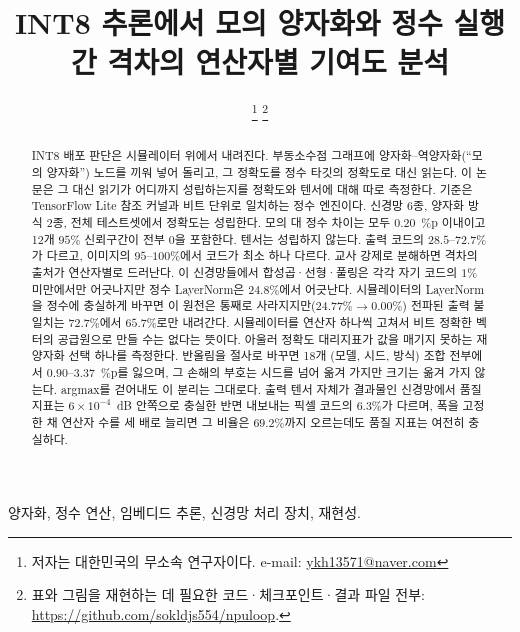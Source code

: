 \documentclass[journal]{IEEEtran}
\begin{document}
\title{INT8 추론에서 모의 양자화와 정수 실행 간 격차의 연산자별 기여도 분석}

\author{%
\thanks{저자는 대한민국의 무소속 연구자이다. e-mail: \url{ykh13571@naver.com}}%
\thanks{표와 그림을 재현하는 데 필요한 코드·체크포인트·결과 파일 전부:
\url{https://github.com/sokldjs554/npuloop}.}}

\maketitle

\begin{abstract}
INT8 배포 판단은 시뮬레이터 위에서 내려진다. 부동소수점 그래프에 양자화--역양자화(``모의 양자화'') 노드를
끼워 넣어 돌리고, 그 정확도를 정수 타깃의 정확도로 대신 읽는다. 이 논문은 그 대신 읽기가 어디까지
성립하는지를 정확도와 텐서에 대해 따로 측정한다. 기준은 TensorFlow Lite 참조 커널과 비트 단위로 일치하는
정수 엔진이다. 신경망 6종, 양자화 방식 2종, 전체 테스트셋에서 정확도는 성립한다. 모의 대 정수 차이는 모두
$0.20$~\%p 이내이고 12개 $95\%$ 신뢰구간이 전부 0을 포함한다. 텐서는 성립하지 않는다. 출력 코드의
$28.5$--$72.7\%$가 다르고, 이미지의 $95$--$100\%$에서 코드가 최소 하나 다르다. 교사 강제로 분해하면 격차의
출처가 연산자별로 드러난다. 이 신경망들에서 합성곱·선형·풀링은 각각 자기 코드의 $1\%$ 미만에서만 어긋나지만 정수 LayerNorm은
$24.8\%$에서 어긋난다. 시뮬레이터의 LayerNorm을 정수에 충실하게 바꾸면 이 원천은 통째로
사라지지만($24.77\% \rightarrow 0.00\%$) 전파된 출력 불일치는 $72.7\%$에서 $65.7\%$로만 내려간다.
시뮬레이터를 연산자 하나씩 고쳐서 비트 정확한 벡터의 공급원으로 만들 수는 없다는 뜻이다. 아울러 정확도
대리지표가 값을 매기지 못하는 재양자화 선택 하나를 측정한다. 반올림을 절사로 바꾸면 18개 (모델, 시드, 방식)
조합 전부에서 $0.90$--$3.37$~\%p를 잃으며, 그 손해의 부호는 시드를 넘어 옮겨 가지만 크기는 옮겨 가지 않는다.
argmax를 걷어내도 이 분리는 그대로다. 출력 텐서 자체가 결과물인 신경망에서 품질 지표는 $6\times10^{-4}$~dB 안쪽으로
충실한 반면 내보내는 픽셀 코드의 $6.3\%$가 다르며, 폭을 고정한 채 연산자 수를 세 배로 늘리면 그 비율은
$69.2\%$까지 오르는데도 품질 지표는 여전히 충실하다.
\end{abstract}

\begin{IEEEkeywords}
양자화, 정수 연산, 임베디드 추론, 신경망 처리 장치, 재현성.
\end{IEEEkeywords}
\end{document}
